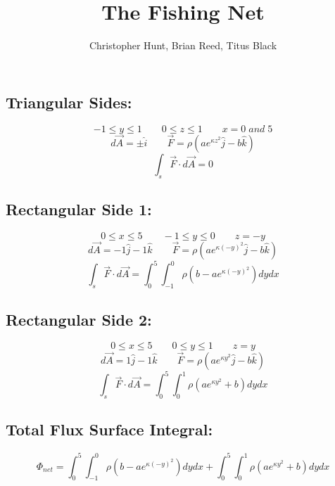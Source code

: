 \documentclass[11pt]{article}
\title{The Fishing Net}
\author{Christopher Hunt, Brian Reed, Titus Black}
\date{}
\begin{document}
\subsection*{Triangular Sides:}
$$-1 \leq y \leq 1 \qquad 0 \leq z \leq 1 \qquad x = 0 \;and\; 5$$
$$d\vec{A} = \pm \hat{i} \qquad \vec{F} = \rho (ae^{\kappa z^2} \hat{j}- b \hat{k})$$
$$\int_s \vec{F} \cdot d \vec{A} = 0$$
\subsection*{Rectangular Side 1:}
$$0 \leq x \leq 5 \qquad -1 \leq y \leq 0 \qquad z = -y$$
$$d\vec{A} = -1\hat{j} -1\hat{k} \qquad \vec{F} = \rho (ae^{\kappa (-y)^2} \hat{j}- b \hat{k})$$
$$\int_s \vec{F} \cdot d \vec{A} = \int_0^5\int_{-1}^0 \rho(b-ae^{\kappa (-y)^2})dydx$$
\subsection*{Rectangular Side 2:}
$$0 \leq x \leq 5 \qquad 0 \leq y \leq 1 \qquad z = y$$
$$d\vec{A} = 1\hat{j} -1\hat{k} \qquad \vec{F} = \rho (ae^{\kappa y^2} \hat{j}- b \hat{k})$$
$$\int_s \vec{F} \cdot d \vec{A} = \int_0^5\int_0^1 \rho(ae^{\kappa y^2} + b)dydx$$

\subsection*{Total Flux Surface Integral:}
$$\Phi_{net} = \int_0^5\int_{-1}^0 \rho(b-ae^{\kappa (-y)^2})dydx + \int_0^5\int_0^1 \rho(ae^{\kappa y^2} + b)dydx$$
\end{document}
